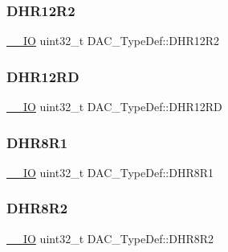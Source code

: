 \mbox{\label{struct_d_a_c___type_def_ab1f777540c487c26bf27e6fa37a644cc}} 
\subsubsection{\texorpdfstring{DHR12R2}{DHR12R2}}
{\footnotesize\ttfamily \mbox{\hyperlink{group___c_m_s_i_s___c_m3__core__definitions_gaec43007d9998a0a0e01faede4133d6be}{\+\_\+\+\_\+\+IO}} uint32\+\_\+t D\+A\+C\+\_\+\+Type\+Def\+::\+D\+H\+R12\+R2}

\mbox{\label{struct_d_a_c___type_def_affa5cc9fe0cc9eb594d703bdc9d9abd9}} 
\subsubsection{\texorpdfstring{DHR12RD}{DHR12RD}}
{\footnotesize\ttfamily \mbox{\hyperlink{group___c_m_s_i_s___c_m3__core__definitions_gaec43007d9998a0a0e01faede4133d6be}{\+\_\+\+\_\+\+IO}} uint32\+\_\+t D\+A\+C\+\_\+\+Type\+Def\+::\+D\+H\+R12\+RD}

\mbox{\label{struct_d_a_c___type_def_a3a382d341fb608a04390bacb8c00b0f0}} 
\subsubsection{\texorpdfstring{DHR8R1}{DHR8R1}}
{\footnotesize\ttfamily \mbox{\hyperlink{group___c_m_s_i_s___c_m3__core__definitions_gaec43007d9998a0a0e01faede4133d6be}{\+\_\+\+\_\+\+IO}} uint32\+\_\+t D\+A\+C\+\_\+\+Type\+Def\+::\+D\+H\+R8\+R1}

\mbox{\label{struct_d_a_c___type_def_a3b096b71656f8fb32cd18b4c8b1d2334}} 
\subsubsection{\texorpdfstring{DHR8R2}{DHR8R2}}
{\footnotesize\ttfamily \mbox{\hyperlink{group___c_m_s_i_s___c_m3__core__definitions_gaec43007d9998a0a0e01faede4133d6be}{\+\_\+\+\_\+\+IO}} uint32\+\_\+t D\+A\+C\+\_\+\+Type\+Def\+::\+D\+H\+R8\+R2}

